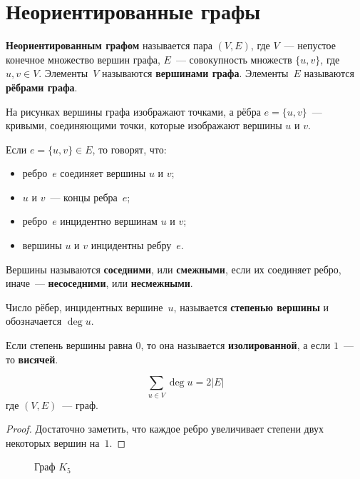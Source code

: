 \section{Неориентированные графы}
 \textbf{Неориентированным графом} называется пара $(V, E)$, где $V$~--- непустое конечное множество вершин графа, $E$~--- совокупность множеств $\{ u, v \}$, где $u, v \in V$.
Элементы~$V$ называются \textbf{вершинами графа}.
Элементы~$E$ называются \textbf{рёбрами графа}.

На рисунках вершины графа изображают точками, а рёбра $e = \{ u, v \}$~--- кривыми, соединяющими точки, которые изображают вершины $u$ и $v$.

Если $e = \{ u, v \} \in E$, то говорят, что:
\begin{itemize}
	\item ребро~$e$ соединяет вершины $u$ и $v$;
	\item $u$ и $v$~--- концы ребра~$e$;
	\item ребро~$e$ инцидентно вершинам $u$ и $v$;
	\item вершины $u$ и $v$ инцидентны ребру~$e$.
\end{itemize}

Вершины называются \textbf{соседними}, или \textbf{смежными}, если их соединяет ребро, иначе~--- \textbf{несоседними}, или \textbf{несмежными}.

 Число рёбер, инцидентных вершине~$u$, называется \textbf{степенью вершины} и обозначается $\deg u$.

Если степень вершины равна $0$, то она называется \textbf{изолированной}, а если $1$~--- то \textbf{висячей}.

\begin{lemma}[о~рукопожатиях]
\begin{equation*}
\sum_{u \in V} \deg u = 2|E|
\end{equation*}
где $(V, E)$~--- граф.
\end{lemma}
\begin{proof}
Достаточно заметить, что каждое ребро увеличивает степени двух некоторых вершин на~$1$.
\end{proof}

\begin{wrapfigure}{r}{0pt}
\noindent
{}
\caption{Граф $K_5$}
\end{wrapfigure}

